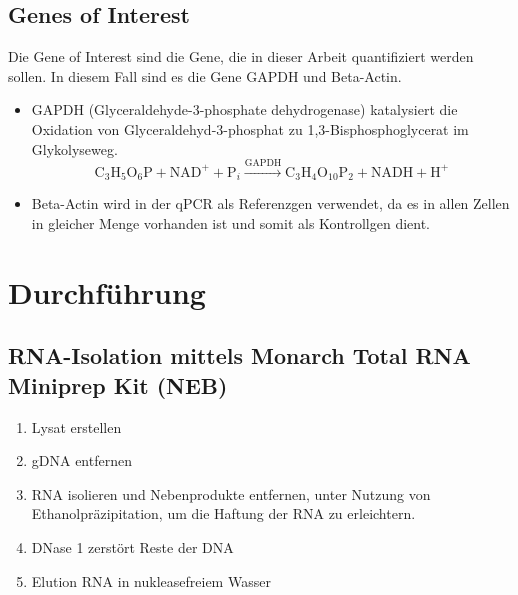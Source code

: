 \documentclass{article}
\begin{document}
\subsection*{Genes of Interest}
Die Gene of Interest sind die Gene, die in dieser Arbeit quantifiziert
werden sollen. In diesem Fall sind es die Gene GAPDH und Beta-Actin.
\begin{itemize}
    \item GAPDH (Glyceraldehyde-3-phosphate dehydrogenase) katalysiert die 
    Oxidation von Glyceraldehyd-3-phosphat zu
    1,3-Bisphosphoglycerat im Glykolyseweg.
\[
\text{C}_3\text{H}_5\text{O}_6\text{P} + \text{NAD}^+ + \text{P}_i \xrightarrow{\text{GAPDH}} \text{C}_3\text{H}_4\text{O}_{10}\text{P}_2 + \text{NADH} + \text{H}^+
\]

    \item Beta-Actin wird in der qPCR als Referenzgen verwendet, da es in allen
    Zellen in gleicher Menge vorhanden ist und somit als Kontrollgen dient.
    
\end{itemize}


\section{Durchführung}

\subsection{RNA-Isolation mittels Monarch\textsuperscript{\textregistered} Total RNA Miniprep Kit (NEB)}

\begin{enumerate}
    \item Lysat erstellen
    \item gDNA entfernen
    \item RNA isolieren und Nebenprodukte entfernen, unter Nutzung von Ethanolpräzipitation, um die Haftung der RNA zu erleichtern.
    \item DNase 1 zerstört Reste der DNA
    \item Elution RNA in nukleasefreiem Wasser
\end{enumerate}
\end{document}

